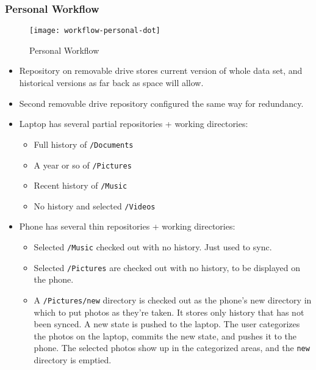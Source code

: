 \documentclass[a4paper]{article}
\begin{document}
\subsubsection{Personal Workflow}

  \begin{figure}[h]
    \caption{Personal Workflow}
    \label{fig:workflow-personal}
    \centering
      \texttt{[image: workflow-personal-dot]}
  \end{figure}

  \begin{itemize}
  \item
    Repository on removable drive stores current version of whole data
    set, and historical versions as far back as space will allow.
  \item
    Second removable drive repository configured the same way for
    redundancy.
  \item
    Laptop has several partial repositories + working directories:

    \begin{itemize}
    \item
      Full history of \texttt{/Documents}
    \item
      A year or so of \texttt{/Pictures}
    \item
      Recent history of \texttt{/Music}
    \item
      No history and selected \texttt{/Videos}
    \end{itemize}
  \item
    Phone has several thin repositories + working directories:

    \begin{itemize}
    \item
      Selected \texttt{/Music} checked out with no history. Just used to
      sync.
    \item
      Selected \texttt{/Pictures} are checked out with no history, to be
      displayed on the phone.
    \item
      A \texttt{/Pictures/new} directory is checked out as the phone's
      new directory in which to put photos as they're taken. It stores
      only history that has not been synced. A new state is pushed to
      the laptop. The user categorizes the photos on the laptop, commits
      the new state, and pushes it to the phone. The selected photos
      show up in the categorized areas, and the \texttt{new} directory
      is emptied.
    \end{itemize}
  \end{itemize}
\end{document}
